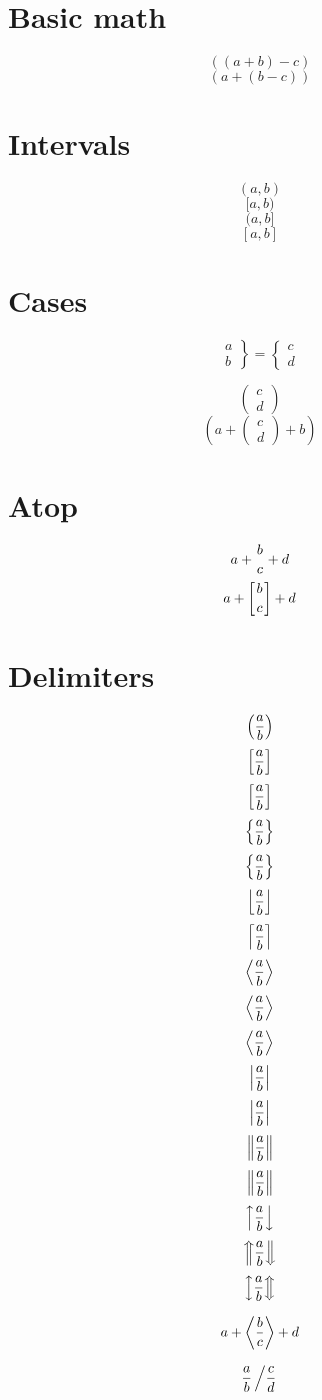 \documentclass{article}
\begin{document}
%
%
%
%
%

\section{Basic math}
\[ ((a + b) - c) \]
\[ (a + (b - c)) \]

\section{Intervals}
\[ (a,b) \]
\[ [a,b) \]
\[ (a,b] \]
\[ [a,b] \]

\section{Cases}

\[ \left.\begin{array}{l} a \\ b \end{array}\right\}
  = \left\{\begin{array}{l} c\\ d\end{array}\right. \]

\[ \left(\begin{array}{l} c\\ d\end{array}\right) \]
\[ (a + \left(\begin{array}{l} c\\ d\end{array}\right) + b) \]

\section{Atop}
\[ a + { b \atop c } + d \]
\[ a + \left[ b \atop c \right] + d \]


\section{Delimiters}
\[ \left( {a \over b} \right) \]
\[ \left[ {a \over b} \right] \]
\[ \left\lbrack {a \over b} \right\rbrack \]
\[ \left\{ {a \over b} \right\} \]
\[ \left\lbrace {a \over b} \right\rbrace \]
\[ \left\lfloor {a \over b} \right\rfloor \]
\[ \left\lceil {a \over b} \right\rceil \]
\[ \left< {a \over b} \right> \]
\[ \left\langle {a \over b} \right\rangle \]
\[ \left\delimiter"426830A {a \over b} \right\delimiter"526930B \]
\[ \left| {a \over b} \right| \]
\[ \left\vert {a \over b} \right\vert \]
\[ \left\| {a \over b} \right\| \]
\[ \left\Vert {a \over b} \right\Vert \]
\[ \left\uparrow {a \over b} \right\downarrow \]
\[ \left\Uparrow {a \over b} \right\Downarrow \]
\[ \left\updownarrow {a \over b} \right\Updownarrow \]



\def\foo{\langle}
\def\bar{\rangle}
\[ a + \left\foo {b \over c} \right\bar + d \]

\[ {a \over b} \left/ {c \over d} \right. \]
\end{document}
